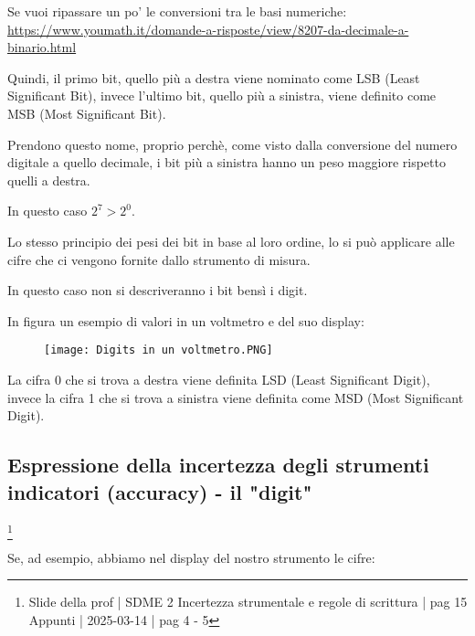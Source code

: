 \begin{tcolorbox}
    Se vuoi ripassare un po' le conversioni tra le basi numeriche: \newline 
    \url{https://www.youmath.it/domande-a-risposte/view/8207-da-decimale-a-binario.html}
\end{tcolorbox}

Quindi, il primo bit, quello più a destra viene nominato come LSB (Least Significant Bit), 
invece l'ultimo bit, quello più a sinistra, viene definito come MSB (Most Significant Bit). \newline 

Prendono questo nome, proprio perchè, come visto dalla conversione del numero digitale a quello decimale, 
i bit più a sinistra hanno un peso maggiore rispetto quelli a destra. \newline 

In questo caso $2^{7} > 2^{0}$. \newline 

Lo stesso principio dei pesi dei bit in base al loro ordine, lo si può applicare alle cifre che ci vengono fornite dallo strumento di misura. \newline 

In questo caso non si descriveranno i bit bensì i digit. \newline 

In figura un esempio di valori in un voltmetro e del suo display: 

\begin{figure}[h]
    \centering
    \texttt{[image: Digits in un voltmetro.PNG]}
\end{figure}

\newpage 

La cifra 0 che si trova a destra viene definita LSD (Least Significant Digit), 
invece la cifra 1 che si trova a sinistra viene definita come MSD (Most Significant Digit). \newline 

\newpage 

\subsection{Espressione della incertezza degli strumenti indicatori (accuracy) - il "digit"}
\footnote{Slide della prof | SDME 2 Incertezza strumentale e regole di scrittura | pag 15 \\  
Appunti | 2025-03-14 | pag 4 - 5}

Se, ad esempio, abbiamo nel display del nostro strumento le cifre: 

